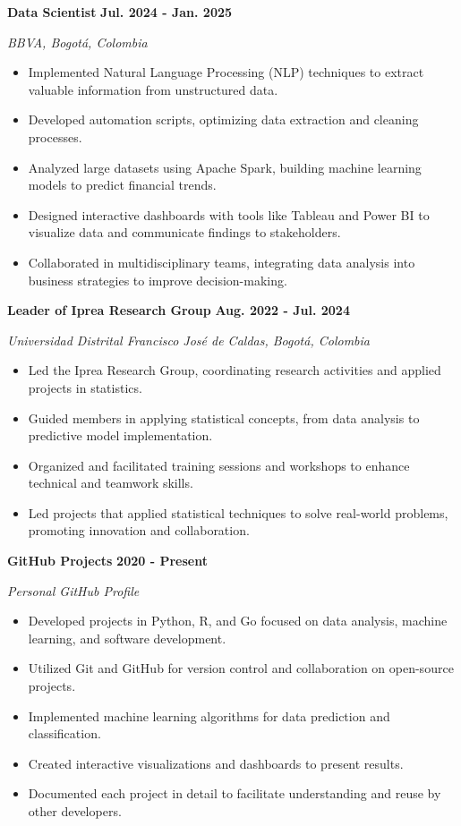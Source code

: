 \documentclass[paper=a4,fontsize=11pt]{scrartcl} %
\newcommand{\sepspace}{\vspace*{0.8em}}
\newcommand{\WorkEntry}[4]{%
  \noindent \textbf{#1} \hfill \textbf{#2} \par
  \noindent \textit{#3} \par
  \noindent \small #4 
  \normalsize \par \sepspace
}
\begin{document}
\WorkEntry{Data Scientist}{Jul. 2024 - Jan. 2025}{BBVA, Bogotá, Colombia}{%
\begin{itemize}[leftmargin=*, noitemsep]
    \item Implemented Natural Language Processing (NLP) techniques to extract valuable information from unstructured data.
    \item Developed automation scripts, optimizing data extraction and cleaning processes.
    \item Analyzed large datasets using Apache Spark, building machine learning models to predict financial trends.
    \item Designed interactive dashboards with tools like Tableau and Power BI to visualize data and communicate findings to stakeholders.
    \item Collaborated in multidisciplinary teams, integrating data analysis into business strategies to improve decision-making.
\end{itemize}
}

\WorkEntry{Leader of Iprea Research Group}{Aug. 2022 - Jul. 2024}{Universidad Distrital Francisco José de Caldas, Bogotá, Colombia}{%
\begin{itemize}[leftmargin=*, noitemsep]
    \item Led the Iprea Research Group, coordinating research activities and applied projects in statistics.
    \item Guided members in applying statistical concepts, from data analysis to predictive model implementation.
    \item Organized and facilitated training sessions and workshops to enhance technical and teamwork skills.
    \item Led projects that applied statistical techniques to solve real-world problems, promoting innovation and collaboration.
\end{itemize}
}

\WorkEntry{GitHub Projects}{2020 - Present}{Personal GitHub Profile}{%
\begin{itemize}[leftmargin=*, noitemsep]
    \item Developed projects in Python, R, and Go focused on data analysis, machine learning, and software development.
    \item Utilized Git and GitHub for version control and collaboration on open-source projects.
    \item Implemented machine learning algorithms for data prediction and classification.
    \item Created interactive visualizations and dashboards to present results.
    \item Documented each project in detail to facilitate understanding and reuse by other developers.
\end{itemize}
}
\end{document}
